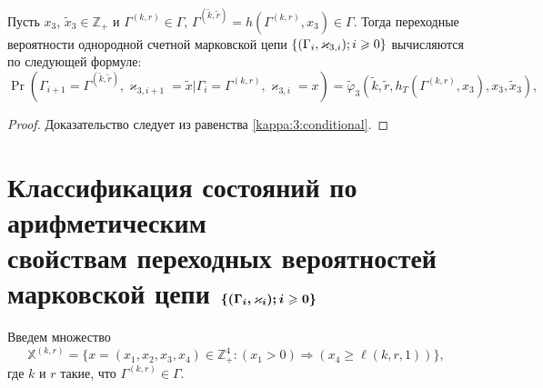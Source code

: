 \documentclass[a4paper,12pt,russian]{extarticle}
\newcommand{\Mark}{\{(\Gamma_i, \varkappa_i); \hm{} i \geqslant 0\}}
\newcommand{\MarkThree}{\{(\Gamma_i, \varkappa_{3,i}); \hm{} i \geqslant 0\}}
\begin{document}
\begin{theorem}
Пусть $x_3$, $\tilde{x}_3\in \mathbb{Z}_+$ и $\Gamma^{(k,r)}\in \Gamma$, $\Gamma^{(\tilde{k},\tilde{r})}=h(\Gamma^{(k,r)},x_3) \in \Gamma$. Тогда переходные вероятности однородной счетной марковской цепи $\MarkThree$ вычисляются по следующей формуле:
\begin{equation}
\Pr (\Gamma_{i+1}=\Gamma^{(\tilde{k},\tilde{r})},\varkappa_{3,i+1}=\tilde{x}|\Gamma_{i}=\Gamma^{(k,r)},\varkappa_{3,i}=x) 
= \widetilde{\varphi}_3(\tilde{k},\tilde{r},h_T(\Gamma^{(k,r)},x_3),x_3,\tilde{x}_3),
\label{transitionToProve:three}
\end{equation}
\end{theorem}
\begin{proof}
Доказательство следует из равенства \eqref{kappa:3:conditional}.
\end{proof}



\section[Классификация состояний по арифметическим свойствам переходных вероятностей марковской цепи $\boldsymbol{\Mark}$]%
{Классификация состояний по арифметическим \\ свойствам переходных вероятностей марковской цепи $\boldsymbol{\Mark}$}
Введем множество 
\begin{equation*}
{\mathbb X}^{(k,r)} = \{x = (x_1,x_2,x_3,x_4) \in \mathbb{Z}_+^4 \colon (x_1 > 0) \Rightarrow (x_4 \geqslant \ell(k,r,1))\},
\end{equation*}
где $k$ и $r$ такие, что $\Gamma^{(k,r)}\in \Gamma$. 
\end{document}
